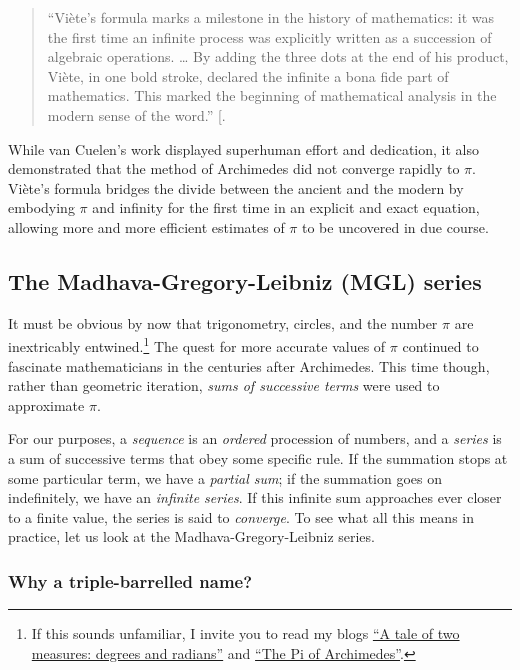 \documentclass[
  a4paper,
]{article}
\begin{document}
\begin{quote}
``Viète's formula marks a milestone in the history of mathematics: it
was the first time an infinite process was explicitly written as a
succession of algebraic operations. \ldots{} By adding the three dots at
the end of his product, Viète, in one bold stroke, declared the infinite
a bona fide part of mathematics. This marked the beginning of
mathematical analysis in the modern sense of the word.''
{[}\citeproc{ref-maor1998}{14}{]}.
\end{quote}

While van Cuelen's work displayed superhuman effort and dedication, it
also demonstrated that the method of Archimedes did not converge rapidly
to \(\pi\). Viète's formula bridges the divide between the ancient and
the modern by embodying \(\pi\) and infinity for the first time in an
explicit and exact equation, allowing more and more efficient estimates
of \(\pi\) to be uncovered in due course.

\subsection{The Madhava-Gregory-Leibniz (MGL)
series}\label{the-madhava-gregory-leibniz-mgl-series}

It must be obvious by now that trigonometry, circles, and the number
\(\pi\) are inextricably entwined.\footnote{If this sounds unfamiliar, I
  invite you to read my blogs
  \href{https://swanlotus.netlify.app/blogs/a-tale-of-two-measures-degrees-and-radians}{``A
  tale of two measures: degrees and radians''} and
  \href{https://swanlotus.netlify.app/blogs/the-pi-of-archimedes}{``The
  Pi of Archimedes''}.} The quest for more accurate values of \(\pi\)
continued to fascinate mathematicians in the centuries after Archimedes.
This time though, rather than geometric iteration, \emph{sums of
successive terms} were used to approximate \(\pi\).

For our purposes, a \emph{sequence} is an \emph{ordered} procession of
numbers, and a \emph{series} is a sum of successive terms that obey some
specific rule. If the summation stops at some particular term, we have a
\emph{partial sum}; if the summation goes on indefinitely, we have an
\emph{infinite series}. If this infinite sum approaches ever closer to a
finite value, the series is said to \emph{converge}. To see what all
this means in practice, let us look at the Madhava-Gregory-Leibniz
series.

\subsubsection{Why a triple-barrelled
name?}\label{why-a-triple-barrelled-name}
\end{document}
